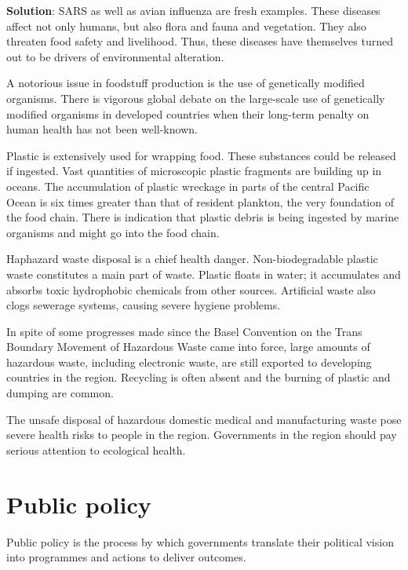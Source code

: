 \documentclass[
  openany]{book}
\newenvironment{solution}{ {\bfseries Solution}:}{}
\begin{document}
\begin{questions}
\begin{solution}
SARS as well as avian influenza are fresh examples. These diseases affect not only humans, but also flora and fauna and vegetation. They also threaten food safety and livelihood. Thus, these diseases have themselves turned out to be drivers of environmental alteration.

A notorious issue in foodstuff production is the use of genetically modified organisms. There is vigorous global debate on the large-scale use of genetically modified organisms in developed countries when their long-term penalty on human health has not been well-known.

Plastic is extensively used for wrapping food. These substances could be released if ingested. Vast quantities of microscopic plastic fragments are building up in oceans. The accumulation of plastic wreckage in parts of the central Pacific Ocean is six times greater than that of resident plankton, the very foundation of the food chain. There is indication that plastic debris is being ingested by marine organisms and might go into the food chain.

Haphazard waste disposal is a chief health danger. Non-biodegradable plastic waste constitutes a main part of waste. Plastic floats in water; it accumulates and absorbs toxic hydrophobic chemicals from other sources. Artificial waste also clogs sewerage systems, causing severe hygiene problems.

In spite of some progresses made since the Basel Convention on the Trans Boundary Movement of Hazardous Waste came into force, large amounts of hazardous waste, including electronic waste, are still exported to developing countries in the region. Recycling is often absent and the burning of plastic and dumping are common.

The unsafe disposal of hazardous domestic medical and manufacturing waste pose severe health risks to people in the region. Governments in the region should pay serious attention to ecological health.

\end{solution}

\end{questions}

\hypertarget{public-policy}{%
\section{Public policy}\label{public-policy}}

Public policy is the process by which governments translate their political vision into programmes and actions to deliver outcomes.
\end{document}
